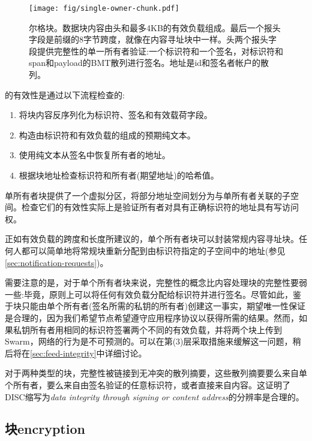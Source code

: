 \begin{figure}[htbp]
   \centering
   \texttt{[image: fig/single-owner-chunk.pdf]}
   \caption[尔格chunk\statusgreen]{尔格块。数据块内容由头和最多4KB的有效负载组成。最后一个报头字段是前缀的8字节跨度，就像在内容寻址块中一样。头两个报头字段提供完整性的单一所有者验证:一个标识符和一个签名，对标识符和span和payload的BMT散列进行签名。地址是id和签名者帐户的散列。}
   \label{fig:single-owner-chunks}
\end{figure}

的有效性是通过以下流程检查的:

\begin{enumerate}
    \item 将块内容反序列化为标识符、签名和有效载荷字段。
    \item 构造由标识符和有效负载的组成的预期纯文本。
    \item 使用纯文本从签名中恢复所有者的地址。
    \item 根据块地址检查标识符和所有者(期望地址)的哈希值。
\end{enumerate}

单所有者块提供了一个虚拟分区，将部分地址空间划分为与单所有者关联的子空间。检查它们的有效性实际上是验证所有者对具有正确标识符的地址具有写访问权。

正如有效负载的跨度和长度所建议的，单个所有者块可以封装常规内容寻址块。任何人都可以简单地将常规块重新分配到由标识符指定的子空间中的地址(参见\ref{sec:notification-requests})。


需要注意的是，对于单个所有者块来说，完整性的概念比内容处理块的完整性要弱一些:毕竟，原则上可以将任何有效负载分配给标识符并进行签名。尽管如此，鉴于块只能由单个所有者(签名所需的私钥的所有者)创建这一事实，期望唯一性保证是合理的，因为我们希望节点希望遵守应用程序协议以获得所需的结果。然而，如果私钥所有者用相同的标识符签署两个不同的有效负载，并将两个块上传到Swarm，网络的行为是不可预测的。可以在第(3)层采取措施来缓解这一问题，稍后将在\ref{sec:feed-integrity}中详细讨论。

对于两种类型的块，完整性被链接到无冲突的散列摘要，这些散列摘要要么来自单个所有者，要么来自由签名验证的任意标识符，或者直接来自内容。这证明了DISC缩写为\emph{data integrity through signing or content address}的分辨率是合理的。

\subsection{块encryption\statusgreen}\label{sec:chunk-encryption}

